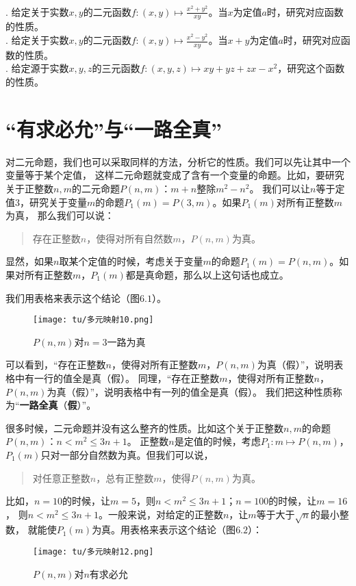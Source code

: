 \documentclass[12pt,UTF8]{ctexbook}
\begin{document}
\begin{xt}
    \mbox{} \\
    . 给定关于实数$x, y$的二元函数$f: (x, y) \mapsto \frac{x^2 + y^2}{xy}$。当$x$为定值$a$时，研究对应函数的性质。\\
    . 给定关于实数$x, y$的二元函数$f: (x, y) \mapsto \frac{x^2 - y^2}{xy}$。当$x+y$为定值$a$时，研究对应函数的性质。\\
    . 给定源于实数$x,y,z$的三元函数$f:(x,y,z) \mapsto xy + yz + zx - x^2$，研究这个函数的性质。
\end{xt}


\section{“有求必允”与“一路全真”}

对二元命题，我们也可以采取同样的方法，分析它的性质。我们可以先让其中一个变量等于某个定值，
这样二元命题就变成了含有一个变量的命题。比如，要研究关于正整数$n,m$的二元命题$P(n,m)$：$m + n$整除$m^2 - n^2$。
我们可以让$n$等于定值$3$，研究关于变量$m$的命题$P_1 (m) = P(3,m)$。如果$P_1(m)$对所有正整数$m$为真，
那么我们可以说：
\begin{quotation}
    存在正整数$n$，使得对所有自然数$m$，$P(n,m)$为真。
\end{quotation}
显然，如果$n$取某个定值的时候，考虑关于变量$m$的命题$P_1 (m) = P(n,m)$。如果对所有正整数$m$，$P_1(m)$都是真命题，那么以上这句话也成立。

我们用表格来表示这个结论（图$6.1$）。

\begin{figure}[h] %
    \vspace{4pt}
    \centering
    \texttt{[image: tu/多元映射10.png]}
    \caption{$P(n,m)$对$n=3$一路为真}
\end{figure}

可以看到，“存在正整数$n$，使得对所有正整数$m$，$P(n,m)$为真（假）”，说明表格中有一行的值全是真（假）。
同理，“存在正整数$m$，使得对所有正整数$n$，$P(n,m)$为真（假）”，说明表格中有一列的值全是真（假）。
我们把这种性质称为“\textbf{一路全真}（\textbf{假}）”。

很多时候，二元命题并没有这么整齐的性质。比如这个关于正整数$n,m$的命题$P(n,m)$：$n < m^2 \leqslant 3n+1$。
正整数$n$是定值的时候，考虑$P_1 : m \mapsto P(n,m)$，$P_1(m)$只对一部分自然数为真。但我们可以说，
\begin{quotation}
    对任意正整数$n$，总有正整数$m$，使得$P(n,m)$为真。
\end{quotation}
比如，$n=10$的时候，让$m = 5$，则$n < m^2 \leqslant 3n+1$；$n=100$的时候，让$m = 16$，
则$n < m^2 \leqslant 3n+1$。一般来说，对给定的正整数$n$，让$m$等于大于$\sqrt{n}$的最小整数，
就能使$P_1(m)$为真。用表格来表示这个结论（图$6.2$）：
\begin{figure}[H] %
    \vspace{4pt}
    \centering
    \texttt{[image: tu/多元映射12.png]}
    \caption{$P(n,m)$对$n$有求必允}
\end{figure}
\end{document}
